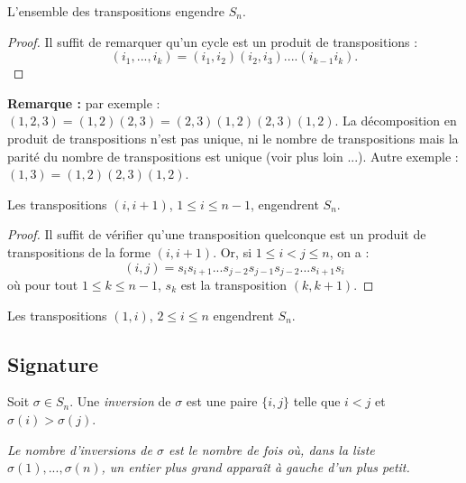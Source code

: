 \documentclass[class=report,crop=false]{standalone}
\begin{document}
\begin{corollaire}
L'ensemble des transpositions engendre $S_n$.
\end{corollaire}

\begin{proof}
Il suffit de remarquer qu'un cycle est un produit de transpositions :
\[(i_1,...,i_k) = (i_1,i_2)(i_2,i_3)....(i_{k-1}i_k) .\]

\end{proof}

{\bf Remarque :} par exemple : $(1,2,3) =(1,2)(2,3)=(2,3)(1,2)(2,3)(1,2)$. La décomposition en produit de transpositions n'est pas unique, ni le nombre de transpositions mais la parité du nombre de transpositions est unique (voir plus loin ...). Autre exemple : $(1,3)=(1,2)(2,3)(1,2)$.


\begin{corollaire}
Les transpositions $(i,i+1)$, $1 \le i \le n-1$, engendrent $S_n$.
\end{corollaire}

\begin{proof}
Il suffit de vérifier qu'une transposition quelconque est un produit de transpositions de la forme $(i,i+1)$. Or, si $1 \le i < j \le n$, on a :
\[(i,j) = s_is_{i+1}...s_{j-2}s_{j-1}s_{j-2}...s_{i+1}s_i\]
où pour tout $1\le k\le n-1$, $s_k$ est la transposition $(k,k+1)$.
\end{proof}

\begin{exercicecours}
Les transpositions $(1,i)$, $2 \le i \le n$ engendrent $S_n$.
\end{exercicecours}

\subsection{Signature}

Soit $\sigma \in S_n$. Une {\it inversion} de $\sigma$ est une paire $\{i,j\}$ telle que $i < j$ et $\sigma(i)>\sigma(j)$. 

{\it \og Le nombre d'inversions de $\sigma$ est le nombre de fois où, dans la liste $\sigma(1),...,\sigma(n)$, un entier plus grand appara\^it à gauche d'un plus petit.\fg}
\end{document}
